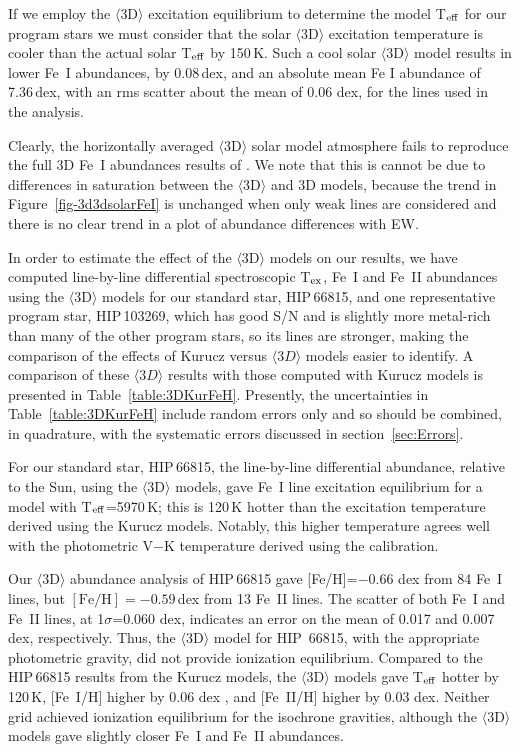 \documentclass[revtex4]{emulateapj}
\begin{document}
If we employ the $\langle$3D$\rangle$ excitation equilibrium to determine the model T$_{\rm eff}$ for our program stars we must consider that the solar $\langle$3D$\rangle$ excitation temperature is cooler than the actual solar T$_{\rm eff}$ by 150\,K.  Such a cool solar $\langle$3D$\rangle$ model results in lower Fe~I abundances, by 0.08\,dex, and an absolute mean Fe I abundance of 7.36\,dex, with an rms scatter about the mean of 0.06 dex, for the lines used in the \citet{Asplund2000} analysis.

Clearly, the horizontally averaged $\langle$3D$\rangle$ solar model atmosphere \citep{Magic2013} fails to reproduce the full 3D Fe~I abundances results of \citet{Asplund2000}.  We note that this is cannot be due to differences in saturation between the $\langle$3D$\rangle$ and 3D models, because the trend in Figure~\ref{fig-3d3dsolarFeI} is unchanged when only weak lines are considered and there is no clear trend in a plot of abundance differences with EW.

In order to estimate the effect of the $\langle$3D$\rangle$ models on our results, we have computed line-by-line differential spectroscopic T$_{\rm ex}$, Fe~I and Fe~II abundances using the $\langle$3D$\rangle$ models for our standard star, HIP\,66815, and one representative program star, HIP\,103269, which has good S/N and is slightly more metal-rich than many of the other program stars, so its lines are stronger, making the comparison of the effects of Kurucz versus $\langle 3D\rangle$ models easier to identify.  A comparison of these $\langle 3D\rangle$ results with those computed with Kurucz models is presented in Table~\ref{table:3DKurFeH}.  Presently, the uncertainties in Table~\ref{table:3DKurFeH} include random errors only and so should be combined, in quadrature, with the systematic errors discussed in section~\ref{sec:Errors}.

For our standard star, HIP\,66815, the line-by-line differential abundance, relative to the Sun, using the \citet{Magic2013} $\langle$3D$\rangle$ models, gave Fe~I line excitation equilibrium for a model with T$_{\rm eff}$=5970\,K; this is 120\,K hotter than the excitation temperature derived using the Kurucz models.  Notably, this higher temperature agrees well with the photometric V$-$K temperature derived using the \citet{Cas2010} calibration.  

Our $\langle$3D$\rangle$ abundance analysis of HIP\,66815 gave [Fe/H]=$-$0.66 dex from 84 Fe~I lines, but $\mathrm{[Fe/H]}=-0.59$\,dex from 13 Fe~II lines.  The scatter of both Fe~I and Fe~II lines, at 1$\sigma$=0.060 dex, indicates an error on the
mean of 0.017 and 0.007 dex, respectively.  Thus, the $\langle$3D$\rangle$ model for HIP~66815, with the appropriate photometric gravity, did not provide ionization equilibrium.  Compared to the HIP\,66815 results from the Kurucz models, the $\langle$3D$\rangle$ models gave T$_{\rm eff}$ hotter by 120\,K, [Fe~I/H] higher by 0.06 dex , and [Fe~II/H] higher by 0.03 dex.  Neither grid achieved ionization equilibrium for the isochrone gravities, although the $\langle$3D$\rangle$ models gave slightly closer Fe~I and Fe~II abundances.
\end{document}

